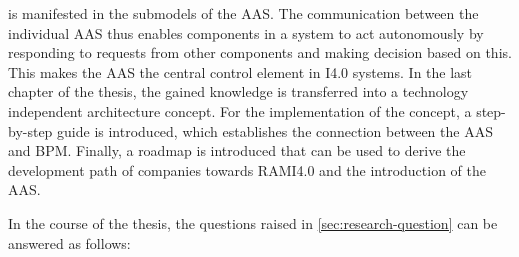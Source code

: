 is manifested in the submodels of the \ac{AAS}. The communication between the individual \ac{AAS} thus enables components in a system to act autonomously by responding to requests from other components and making decision based on this. This makes the \ac{AAS} the central control element in \ac{I4.0} systems. In the last chapter of the thesis, the gained knowledge is transferred into a technology independent architecture concept. For the implementation of the concept, a step-by-step guide is introduced, which establishes the connection between the \ac{AAS} and \ac{BPM}. Finally, a roadmap is introduced that can be used to derive the development path of companies towards \ac{RAMI4.0} and the introduction of the \ac{AAS}.

In the course of the thesis, the questions raised in \ref{sec:research-question} can be answered as follows:

